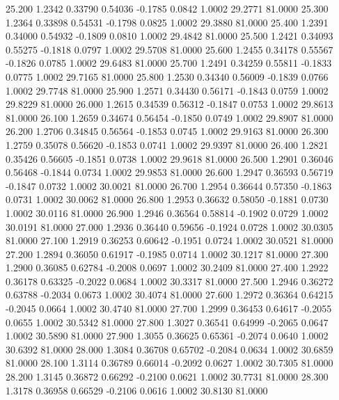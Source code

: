   25.200   1.2342   0.33790   0.54036  -0.1785   0.0842   1.0002  29.2771  81.0000
  25.300   1.2364   0.33898   0.54531  -0.1798   0.0825   1.0002  29.3880  81.0000
  25.400   1.2391   0.34000   0.54932  -0.1809   0.0810   1.0002  29.4842  81.0000
  25.500   1.2421   0.34093   0.55275  -0.1818   0.0797   1.0002  29.5708  81.0000
  25.600   1.2455   0.34178   0.55567  -0.1826   0.0785   1.0002  29.6483  81.0000
  25.700   1.2491   0.34259   0.55811  -0.1833   0.0775   1.0002  29.7165  81.0000
  25.800   1.2530   0.34340   0.56009  -0.1839   0.0766   1.0002  29.7748  81.0000
  25.900   1.2571   0.34430   0.56171  -0.1843   0.0759   1.0002  29.8229  81.0000
  26.000   1.2615   0.34539   0.56312  -0.1847   0.0753   1.0002  29.8613  81.0000
  26.100   1.2659   0.34674   0.56454  -0.1850   0.0749   1.0002  29.8907  81.0000
  26.200   1.2706   0.34845   0.56564  -0.1853   0.0745   1.0002  29.9163  81.0000
  26.300   1.2759   0.35078   0.56620  -0.1853   0.0741   1.0002  29.9397  81.0000
  26.400   1.2821   0.35426   0.56605  -0.1851   0.0738   1.0002  29.9618  81.0000
  26.500   1.2901   0.36046   0.56468  -0.1844   0.0734   1.0002  29.9853  81.0000
  26.600   1.2947   0.36593   0.56719  -0.1847   0.0732   1.0002  30.0021  81.0000
  26.700   1.2954   0.36644   0.57350  -0.1863   0.0731   1.0002  30.0062  81.0000
  26.800   1.2953   0.36632   0.58050  -0.1881   0.0730   1.0002  30.0116  81.0000
  26.900   1.2946   0.36564   0.58814  -0.1902   0.0729   1.0002  30.0191  81.0000
  27.000   1.2936   0.36440   0.59656  -0.1924   0.0728   1.0002  30.0305  81.0000
  27.100   1.2919   0.36253   0.60642  -0.1951   0.0724   1.0002  30.0521  81.0000
  27.200   1.2894   0.36050   0.61917  -0.1985   0.0714   1.0002  30.1217  81.0000
  27.300   1.2900   0.36085   0.62784  -0.2008   0.0697   1.0002  30.2409  81.0000
  27.400   1.2922   0.36178   0.63325  -0.2022   0.0684   1.0002  30.3317  81.0000
  27.500   1.2946   0.36272   0.63788  -0.2034   0.0673   1.0002  30.4074  81.0000
  27.600   1.2972   0.36364   0.64215  -0.2045   0.0664   1.0002  30.4740  81.0000
  27.700   1.2999   0.36453   0.64617  -0.2055   0.0655   1.0002  30.5342  81.0000
  27.800   1.3027   0.36541   0.64999  -0.2065   0.0647   1.0002  30.5890  81.0000
  27.900   1.3055   0.36625   0.65361  -0.2074   0.0640   1.0002  30.6392  81.0000
  28.000   1.3084   0.36708   0.65702  -0.2084   0.0634   1.0002  30.6859  81.0000
  28.100   1.3114   0.36789   0.66014  -0.2092   0.0627   1.0002  30.7305  81.0000
  28.200   1.3145   0.36872   0.66292  -0.2100   0.0621   1.0002  30.7731  81.0000
  28.300   1.3178   0.36958   0.66529  -0.2106   0.0616   1.0002  30.8130  81.0000
